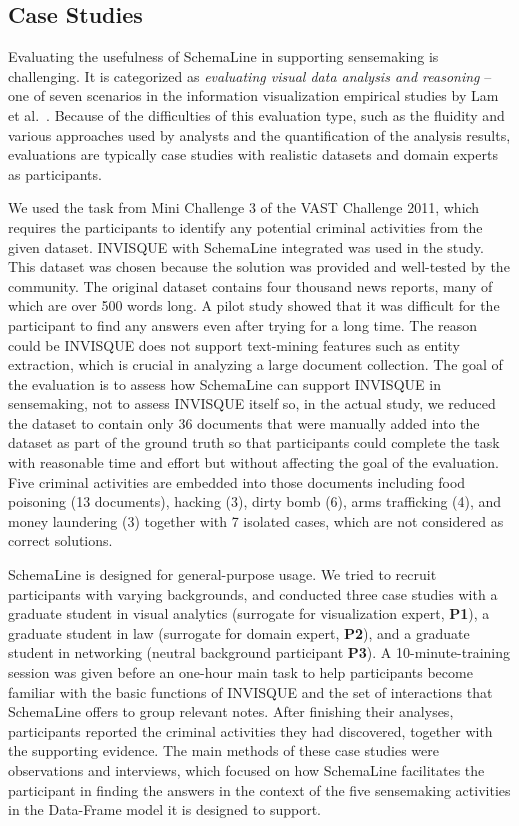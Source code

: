\subsection{Case Studies}
Evaluating the usefulness of SchemaLine in supporting sensemaking is challenging. It is categorized as \textit{evaluating visual data analysis and reasoning} -- one of seven scenarios in the information visualization empirical studies by Lam et al.~\cite{Lam2012}. Because of the difficulties of this evaluation type, such as the fluidity and various approaches used by analysts and the quantification of the analysis results, evaluations are typically case studies with realistic datasets and domain experts as participants.

We used the task from Mini Challenge 3 of the VAST Challenge 2011, which requires the participants to identify any potential criminal activities from the given dataset. INVISQUE with SchemaLine integrated was used in the study. This dataset was chosen because the solution was provided and well-tested by the community. The original dataset contains four thousand news reports, many of which are over 500 words long. A pilot study showed that it was difficult for the participant to find any answers even after trying for a long time. The reason could be INVISQUE does not support text-mining features such as entity extraction, which is crucial in analyzing a large document collection. The goal of the evaluation is to assess how SchemaLine can support INVISQUE in sensemaking, not to assess INVISQUE itself so, in the actual study, we reduced the dataset to contain only 36 documents that were manually added into the dataset as part of the ground truth so that participants could complete the task with reasonable time and effort but without affecting the goal of the evaluation. Five criminal activities are embedded into those documents including food poisoning (13 documents), hacking (3), dirty bomb (6), arms trafficking (4), and money laundering (3) together with 7 isolated cases, which are not considered as correct solutions.

SchemaLine is designed for general-purpose usage. We tried to recruit participants with varying backgrounds, and conducted three case studies with a graduate student in visual analytics (surrogate for visualization expert, \textbf{P1}), a graduate student in law (surrogate for domain expert, \textbf{P2}), and a graduate student in networking (neutral background participant \textbf{P3}). A 10-minute-training session was given before an one-hour main task to help participants become familiar with the basic functions of INVISQUE and the set of interactions that SchemaLine offers to group relevant notes. After finishing their analyses, participants reported the criminal activities they had discovered, together with the supporting evidence. The main methods of these case studies were observations and interviews, which focused on how SchemaLine facilitates the participant in finding the answers in the context of the five sensemaking activities in the Data-Frame model it is designed to support.

